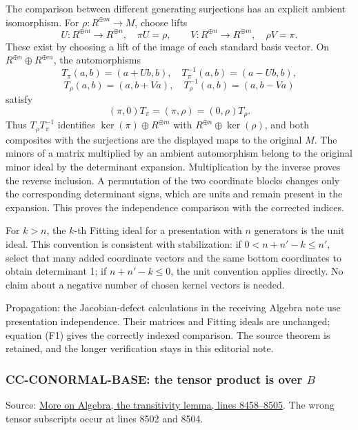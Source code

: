 The comparison between different generating surjections has an explicit ambient isomorphism. For \(\rho:R^{\oplus m}\to M\), choose lifts \[
 U:R^{\oplus m}\to R^{\oplus n},\quad \pi U=\rho,\qquad
 V:R^{\oplus n}\to R^{\oplus m},\quad \rho V=\pi.
\] These exist by choosing a lift of the image of each standard basis vector. On \(R^{\oplus n}\oplus R^{\oplus m}\), the automorphisms \[
 T_\pi(a,b)=(a+Ub,b),\quad T_\pi^{-1}(a,b)=(a-Ub,b),
\] \[
 T_\rho(a,b)=(a,b+Va),\quad T_\rho^{-1}(a,b)=(a,b-Va)
\] satisfy \[
 (\pi,0)T_\pi=(\pi,\rho)=(0,\rho)T_\rho.
\] Thus \(T_\rho T_\pi^{-1}\) identifies \(\ker(\pi)\oplus R^{\oplus m}\) with \(R^{\oplus n}\oplus\ker(\rho)\), and both composites with the surjections are the displayed maps to the original \(M\). The minors of a matrix multiplied by an ambient automorphism belong to the original minor ideal by the determinant expansion. Multiplication by the inverse proves the reverse inclusion. A permutation of the two coordinate blocks changes only the corresponding determinant signs, which are units and remain present in the expansion. This proves the independence comparison with the corrected indices.

For \(k>n\), the \(k\)-th Fitting ideal for a presentation with \(n\) generators is the unit ideal. This convention is consistent with stabilization: if \(0<n+n'-k\leq n'\), select that many added coordinate vectors and the same bottom coordinates to obtain determinant 1; if \(n+n'-k\leq0\), the unit convention applies directly. No claim about a negative number of chosen kernel vectors is needed.

Propagation: the Jacobian-defect calculations in the receiving Algebra note use presentation independence. Their matrices and Fitting ideals are unchanged; equation (F1) gives the correctly indexed comparison. The source theorem is retained, and the longer verification stays in this editorial note.

\subsubsection{\texorpdfstring{CC-CONORMAL-BASE: the tensor product is over \(B\)}{CC-CONORMAL-BASE: the tensor product is over B}}\label{cc-conormal-base-the-tensor-product-is-over-b}

Source: \href{https://github.com/stacks/stacks-project/blob/a04446e57ec1fbc252a871afcec7752fb2807b14/more-algebra.tex\#L8458}{More on Algebra, the transitivity lemma, lines 8458--8505}. The wrong tensor subscripts occur at lines 8502 and 8504.

